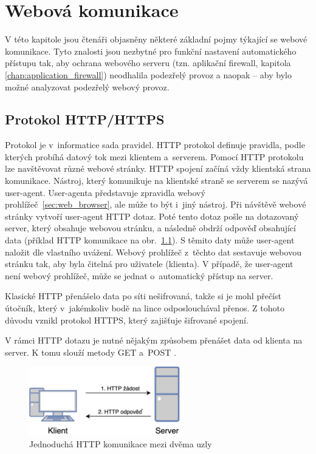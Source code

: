 \chapter{Webová komunikace}
\label{chap:web_communication}
V této kapitole jsou čtenáři objasněny některé základní pojmy týkající se webové komunikace. Tyto znalosti jsou nezbytné pro funkční nastavení automatického přístupu tak, aby ochrana webového serveru (tzn. aplikační firewall, kapitola \ref{chap:application_firewall}) neodhalila podezřelý provoz a naopak -- aby bylo možné analyzovat podezřelý webový provoz.

\section{Protokol HTTP/HTTPS}
\label{sec:http}
Protokol je v~informatice sada pravidel. HTTP protokol definuje pravidla, podle kterých probíhá datový tok mezi klientem a~serverem. Pomocí HTTP protokolu lze navštěvovat různé webové stránky. HTTP spojení začíná vždy klientská strana komunikace. Nástroj, který komunikuje na klientské straně se serverem se nazývá user-agent. User-agenta představuje zpravidla webový prohlížeč~\ref{sec:web_browser}, ale může to být i~jiný nástroj.
Při návštěvě webové stránky vytvoří user-agent HTTP dotaz. Poté tento dotaz pošle na dotazovaný server, který obsahuje webovou stránku, a následně obdrží odpověď obsahující data (příklad HTTP komunikace na obr.~\ref{img:HTTP_request}). S těmito daty může user-agent naložit dle vlastního uvážení. Webový prohlížeč z~těchto dat sestavuje webovou stránku tak, aby byla čitelná pro uživatele (klienta). V případě, že user-agent není webový prohlížeč, může se jednat o~automatický přístup na server.

Klasické HTTP přenášelo data po síti nešifrovaná, takže si je mohl přečíst útočník, který v~jakémkoliv bodě na lince odposlouchával přenos. Z tohoto důvodu vznikl protokol HTTPS, který zajišťuje šifrované spojení.

V rámci HTTP dotazu je nutné nějakým způsobem přenášet data od klienta na server. K tomu slouží metody GET a~POST \cite{bib:httpRFC}. 

\begin{figure}[hbt]
	\centering
	\includegraphics[width=0.6\textwidth]{images/HTTP_request.png}
	\caption{Jednoduchá HTTP komunikace mezi dvěma uzly}
	\label{img:HTTP_request}
\end{figure}

